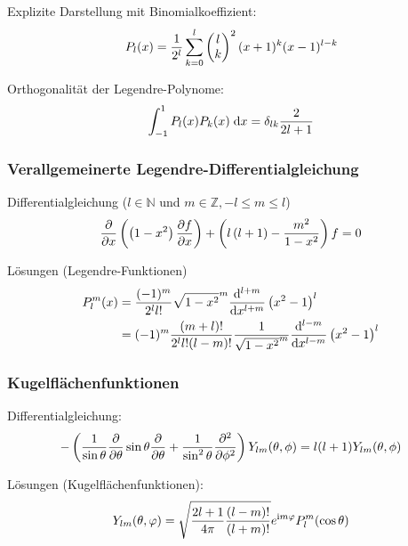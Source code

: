 			\noindent
			Explizite Darstellung mit Binomialkoeffizient:
			\begin{equation}
				P_l(x)=\frac{1}{2^l} \sum_{k=0}^{l}\left(\begin{matrix}l\\k\end{matrix}\right)^2(x+1)^k(x-1)^{l-k}
			\end{equation}

			\noindent
			Orthogonalität der Legendre-Polynome:
			\begin{equation}
				\int_{-1}^1 P_l(x) P_k(x)\;\mathrm{d} x = \delta_{lk} \frac{2}{2l+1}
			\end{equation}

		\subsubsection{Verallgemeinerte Legendre-Differentialgleichung}
			\noindent
			Differentialgleichung ($l\in\mathbb{N}$ und $m\in\mathbb{Z}, -l\le m\le l$)
			\begin{equation}
				\frac{\partial }{\partial x}\left(\left(1-x^2\right)\frac{\partial f}{\partial x}\right)+\left(l\left(l+1\right)-\frac{m^2}{1-x^2}\right)f= 0
			\end{equation}

			\noindent
			Lösungen (Legendre-Funktionen)
			\begin{equation}
				\begin{aligned}
					P_l^m(x) &= \frac{(-1)^m}{2^l l!}\sqrt{1-x^2}^m
					\frac{\mathrm{d}^{l+m}}{\mathrm{d} x^{l+m}}\left(x^2-1\right)^l \\
					&= (-1)^m \frac{(m+l)!}{2^l l! (l-m)!}\frac{1}{\sqrt{1-x^2}^m}
					\frac{\mathrm{d}^{l-m}}{\mathrm{d} x^{l-m}}\left(x^2-1\right)^l \\
				\end{aligned}
			\end{equation}

		\subsubsection{Kugelflächenfunktionen}
			\noindent
			Differentialgleichung:
			\begin{equation}
				-\left(
				\frac{1}{\sin\theta}\frac{\partial }{\partial \theta}\sin\theta\frac{\partial }{\partial \theta} + \frac{1}{\sin^2\theta}\frac{\partial^2}{\partial \phi^2}
				\right)
				Y_{lm}(\theta,\phi) = l(l+1)Y_{lm}(\theta,\phi)
			\end{equation}

			\noindent
			Lösungen (Kugelflächenfunktionen):
			\begin{equation} \label{Eq:SphericalHarmonics}
				Y_{lm}(\theta,\varphi) = \sqrt{\frac{2l+1}{4\pi}\frac{(l-m)!}{(l+m)!}} e^{\mathrm{i} m\varphi} P_l^m(\cos\theta)
			\end{equation}

